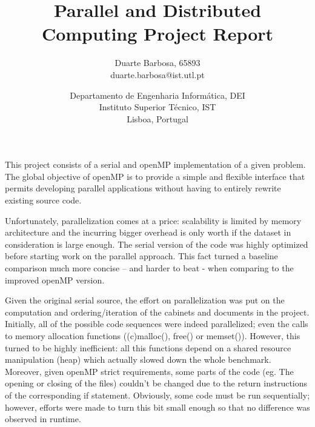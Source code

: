 \documentclass[times, 10pt,twocolumn]{article}
\begin{document}
\title{Parallel and Distributed Computing Project Report}

\author{
Duarte Barbosa, 65893\\
duarte.barbosa@ist.utl.pt\\
\and
Departamento de Engenharia Informática, DEI\\
Instituto Superior Técnico, IST\\
Lisboa, Portugal\\
}

\maketitle
\thispagestyle{empty}

This project consists of a serial and openMP implementation of a given problem. The global objective of openMP is to provide a simple and flexible interface that permits developing parallel applications without having to entirely rewrite existing source code.

	Unfortunately, parallelization comes at a price: scalability is limited by memory architecture and the incurring bigger overhead is only worth if the dataset in consideration is large enough. The serial version of the code was highly optimized before starting work on the parallel approach. This fact turned a baseline comparison much more concise – and harder to beat - when comparing to the improved openMP version.

	Given the original serial source, the effort on parallelization was put on the computation and ordering/iteration of the cabinets and documents in the project.
	Initially, all of the possible code sequences were indeed parallelized; even the calls to memory allocation functions ((c)malloc(), free() or memset()). However, this turned to be highly inefficient: all this functions depend on a shared resource manipulation (heap) which actually slowed down the whole benchmark. Moreover, given openMP strict requirements, some parts of the code (eg. The opening or closing of the files) couldn't be changed due to the return instructions of the corresponding if statement. Obviously, some code must be run sequentially; however, efforts were made to turn this bit small enough so that no difference was observed in runtime.
\end{document}
